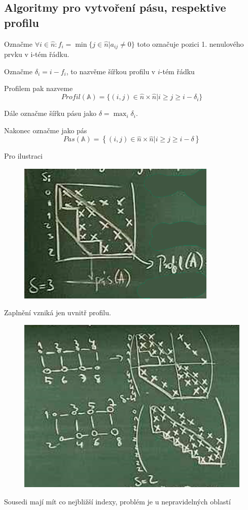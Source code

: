 \documentclass[../main.tex]{subfiles}
\begin{document}
\subsection{Algoritmy pro vytvoření pásu, respektive profilu}

Označme $\forall i\in\hat{n}: f_i = \min\{j\in\hat{n} | a_{ij} \neq 0 \}$ toto označuje 
pozici 1. nenulového prvku v i-tém řádku.

Označme $\delta_i = i - f_i$, to nazvěme šířkou profilu v $i$-tém řádku 

Profilem \matA pak nazveme
\begin{equation*}
    Profil(\mathbb{A}) = \{(i,j)\in \hat{n}\times\hat{n}| i\geq j\geq i-\delta_i  \}
\end{equation*} 

Dále označme šířku pásu jako $\delta = \max_i \delta_i$.

Nakonec označme jako pás 
\begin{equation*}
    Pas(\mathbb{A}) = \left\{ (i,j)\in \hat{n}\times\hat{n} | i\geq j\geq i - \delta   \right\} 
\end{equation*}

Pro ilustraci 
\begin{figure}[H]
    \centering
    \includegraphics[width=0.7\linewidth]{images/26-10-profilpas.png}
\end{figure}

Zaplnění vzniká jen uvnitř profilu.

\begin{example}
    \begin{figure}[H]
        \centering
        \includegraphics[width=0.7\linewidth]{images/26-10-zaplneni-uvnitr.png}
    \end{figure}
    
Sousedi mají mít co nejbližší indexy, problém je u nepravidelných oblastí
\end{example}
\end{document}
